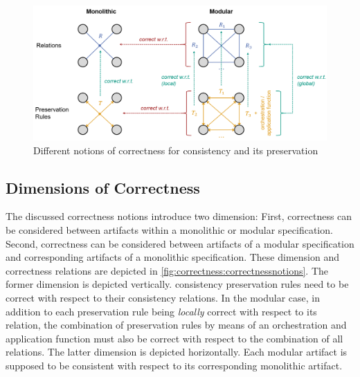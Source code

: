 \begin{figure}
    \centering
    \includegraphics[width=\textwidth]{figures/correctness/formal/correctness_notions.png}
    \caption[Notions of correctness for consistency and its preservation]{Different notions of correctness for consistency and its preservation}
    \label{fig:correctness:correctnessnotions}
\end{figure}


\subsection{Dimensions of Correctness}

The discussed correctness notions introduce two dimension: First, correctness can be considered between artifacts within a monolithic or modular specification. Second, correctness can be considered between artifacts of a modular specification and corresponding artifacts of a monolithic specification. These dimension and correctness relations are depicted in \autoref{fig:correctness:correctnessnotions}.
The former dimension is depicted vertically. \Glspl{consistency preservation rule} need to be correct with respect to their \glspl{consistency relation}.
In the modular case, in addition to each preservation rule being \emph{locally} correct with respect to its relation, the combination of preservation rules by means of an orchestration and application function must also be correct with respect to the combination of all relations.
The latter dimension is depicted horizontally. Each modular artifact is supposed to be consistent with respect to its corresponding monolithic artifact.

